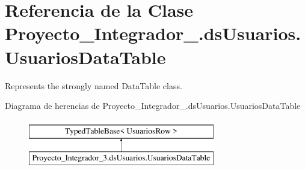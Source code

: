 \hypertarget{class_proyecto___integrador__3_1_1ds_usuarios_1_1_usuarios_data_table}{\section{Referencia de la Clase Proyecto\-\_\-\-Integrador\-\_.\-ds\-Usuarios.\-Usuarios\-Data\-Table}
\label{class_proyecto___integrador__3_1_1ds_usuarios_1_1_usuarios_data_table}
}


Represents the strongly named Data\-Table class.  


Diagrama de herencias de Proyecto\-\_\-\-Integrador\-\_.\-ds\-Usuarios.\-Usuarios\-Data\-Table\begin{figure}[H]
\begin{center}
\leavevmode
\includegraphics[height=2.000000cm]{class_proyecto___integrador__3_1_1ds_usuarios_1_1_usuarios_data_table}
\end{center}
\end{figure}
